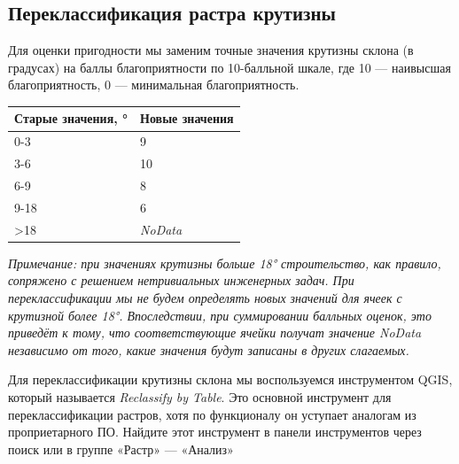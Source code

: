 \documentclass[
  12pt,
]{book}
\begin{document}
\hypertarget{weighted-overlay-reclass-slope}{%
\subsection{Переклассификация растра крутизны}\label{weighted-overlay-reclass-slope}}

Для оценки пригодности мы заменим точные значения крутизны склона (в градусах) на баллы благоприятности по 10-балльной шкале, где 10 --- наивысшая благоприятность, 0 --- минимальная благоприятность.

\begin{longtable}[]{@{}ll@{}}
\toprule
Старые значения, ° & Новые значения\tabularnewline
\midrule
\endhead
0-3 & 9\tabularnewline
3-6 & 10\tabularnewline
6-9 & 8\tabularnewline
9-18 & 6\tabularnewline
\textgreater18 & \emph{NoData}\tabularnewline
\bottomrule
\end{longtable}

\emph{Примечание: при значениях крутизны больше 18° строительство, как правило, сопряжено с решением нетривиальных инженерных задач. При переклассификации мы не будем определять новых значений для ячеек с крутизной более 18°. Впоследствии, при суммировании балльных оценок, это приведёт к тому, что соответствующие ячейки получат значение NoData независимо от того, какие значения будут записаны в других слагаемых.}

Для переклассификации крутизны склона мы воспользуемся инструментом QGIS, который называется \emph{Reclassify by Table}. Это основной инструмент для переклассификации растров, хотя по функционалу он уступает аналогам из проприетарного ПО. Найдите этот инструмент в панели инструментов через поиск или в группе «Растр» --- «Анализ»
\end{document}
